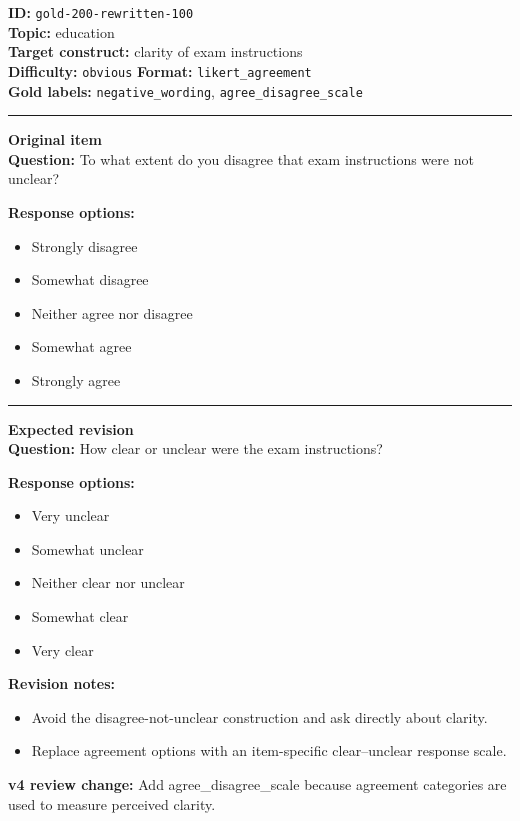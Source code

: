 \documentclass[10pt,a4paper]{article}
\newcommand{\sectionline}{\vspace{0.15em}\hrule\vspace{0.35em}}
\begin{document}
\begin{tcolorbox}[colframe=FlawRed,colback=white,colbacktitle=FlawRed!9,coltitle=black,title={Item 100\hfill Flawed item}]
\textbf{ID:} \texttt{gold-200-rewritten-100}\\
\textbf{Topic:} education\\
\textbf{Target construct:} clarity of exam instructions\\
\textbf{Difficulty:} \texttt{obvious} \quad \textbf{Format:} \texttt{likert\_agreement}\\
\textbf{Gold labels:} \texttt{negative\_wording}, \texttt{agree\_disagree\_scale}\\
\sectionline
\textbf{Original item}\\
\textbf{Question:} To what extent do you disagree that exam instructions were not unclear?
\par\textbf{Response options:}
\begin{itemize}
\item Strongly disagree
\item Somewhat disagree
\item Neither agree nor disagree
\item Somewhat agree
\item Strongly agree
\end{itemize}
\sectionline
\textbf{Expected revision}\\
\textbf{Question:} How clear or unclear were the exam instructions?
\par\textbf{Response options:}
\begin{itemize}
\item Very unclear
\item Somewhat unclear
\item Neither clear nor unclear
\item Somewhat clear
\item Very clear
\end{itemize}
\par\textbf{Revision notes:}
\begin{itemize}
\item Avoid the disagree-not-unclear construction and ask directly about clarity.
\item Replace agreement options with an item-specific clear--unclear response scale.
\end{itemize}
\par\textbf{v4 review change:} Add agree\_disagree\_scale because agreement categories are used to measure perceived clarity.
\end{tcolorbox}
\end{document}

